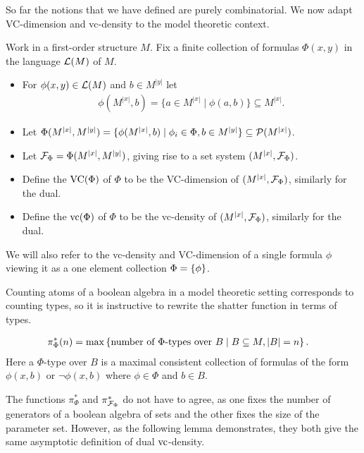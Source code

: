 So far the notions that we have defined are purely combinatorial.
We now adapt VC-dimension and vc-density to the model theoretic context.

\begin{Definition}
  Work in a first-order structure $M$.
  Fix a finite collection of formulas $\Phi(x, y)$ in the language $\mathcal L(M)$ of $M$.

  \begin{itemize}
  \item For $\phi(x, y) \in \mathcal L(M)$ and $b \in M^{|y|}$ let 
    \begin{align*}
      \phi(M^{|x|}, b) = \{a \in M^{|x|} \mid \phi(a, b)\} \subseteq M^{|x|}.
    \end{align*}
  \item Let $\Phi(M^{|x|}, M^{|y|})= \{\phi(M^{|x|}, b) \mid \phi_i \in \Phi, b \in M^{|y|}\} \subseteq \mathcal P(M^{|x|})$.
  \item Let $\mathcal F_\Phi = \Phi(M^{|x|}, M^{|y|})$, giving rise to a set system $(M^{|x|}, \mathcal F_\Phi)$.
  \item Define the  $\operatorname{VC}(\Phi)$ of $\Phi$ to be the VC-dimension of $(M^{|x|}, \mathcal F_\Phi)$, similarly for the dual.
  \item Define the  $\operatorname{vc}(\Phi)$ of $\Phi$ to be the vc-density of $(M^{|x|}, \mathcal F_\Phi)$, similarly for the dual.
  \end{itemize}

  We will also refer to the vc-density and VC-dimension of a single formula $\phi$
  viewing it as a one element collection $\Phi = \left\{\phi\right\}$.
\end{Definition}

Counting atoms of a boolean algebra in a model theoretic setting corresponds to counting types,
so it is instructive to rewrite the shatter function in terms of types.

\begin{Definition} 
  \begin{align*}
    \pi^*_\Phi(n) &= \max \left\{\text{number of $\Phi$-types over $B$} \mid B \subseteq M, |B| = n\right\}.
  \end{align*}
  Here a $\Phi$-type over $B$ is a maximal consistent collection of formulas of the form $\phi(x, b)$ or $\neg\phi(x, b)$
  where $\phi \in \Phi$ and $b \in B$.
\end{Definition}

The functions $\pi^*_{\Phi}$ and $\pi^*_{\mathcal F_\Phi}$ do not have to agree,
as one fixes the number of generators of a boolean algebra of sets and the other fixes the size of the parameter set.
However, as the following lemma demonstrates, they both give the same asymptotic definition of dual $\operatorname{vc}$-density.

